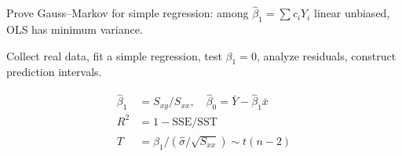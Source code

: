 \begin{exercise}[$\star\star$]
Prove Gauss--Markov for simple regression: among $\hat{\beta}_1=\sum c_i Y_i$ linear unbiased, OLS has minimum variance.
\end{exercise}

\begin{exercise}
Collect real data, fit a simple regression, test $\beta_1=0$, analyze residuals, construct prediction intervals.
\end{exercise}

\begin{keyformulas}
\begin{align*}
\hat{\beta}_1 &= S_{xy}/S_{xx}, \quad \hat{\beta}_0=\bar{Y}-\hat{\beta}_1\bar{x} \\
R^2 &= 1-\text{SSE}/\text{SST} \\
T &= \hat{\beta}_1/(\hat{\sigma}/\sqrt{S_{xx}}) \sim t(n-2)
\end{align*}
\end{keyformulas}
